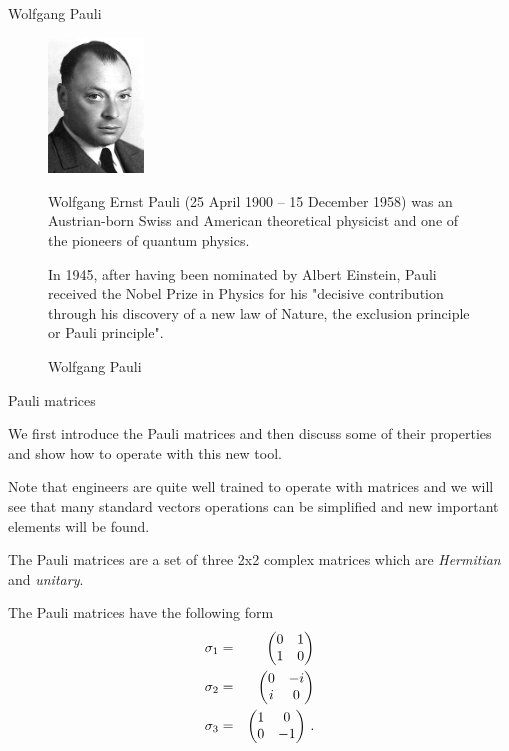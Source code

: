 \documentclass[handout,10pt]{beamer}
\begin{document}
 
\begin{frame}[shrink=10]{Wolfgang Pauli}
\begin{figure}[htb]

\begin{center}
\includegraphics[width=1.0in]{220px-Pauli}
\end{center}

\caption{Wolfgang Pauli}

Wolfgang Ernst Pauli (25 April 1900 -- 15 December 1958) was an Austrian-born Swiss and American theoretical physicist and one of the pioneers of quantum physics. 

In 1945, after having been nominated by Albert Einstein, Pauli received the Nobel Prize in Physics for his "decisive contribution through his discovery of a new law of Nature, the exclusion principle or Pauli principle". 

\end{figure}

\end{frame}


\begin{frame}[fragile]{Pauli matrices}



We first introduce the Pauli matrices and then discuss some of their properties and show how to operate with this new tool.

Note that engineers are quite well trained to operate with matrices and we will see that many standard vectors operations can be simplified and new important elements will be found.

 The Pauli matrices are a set of three 2x2 complex matrices which are \emph{Hermitian} and \emph{unitary}. 
 
  The Pauli matrices have the following form
%
\begin{eqnarray}
\sigma_1 &= & \begin{pmatrix}0 & 1\cr 1 & 0\end{pmatrix} \nonumber \\
%
\sigma_2 &= & \begin{pmatrix}0 & -i\cr i & 0\end{pmatrix} \nonumber \\
%
\sigma_3 &= &\begin{pmatrix}1 & 0\cr 0 & -1\end{pmatrix}  \, .
%
\end{eqnarray}
%

\end{frame}
\end{document}

